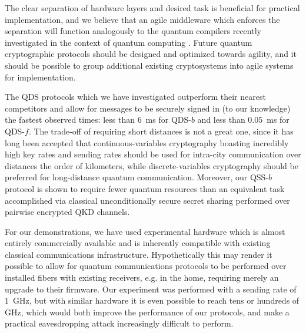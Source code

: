 The clear separation of hardware layers and desired task is beneficial for practical implementation, and we believe that an agile middleware which enforces the separation will function analogously to the quantum compilers recently investigated in the context of quantum computing . Future quantum cryptographic protocols should be designed and optimized towards agility, and it should be possible to group additional existing cryptosystems into agile systems for implementation.

The QDS protocols which we have investigated outperform their nearest competitors and allow for messages to be securely signed in (to our knowledge) the fastest observed times: less than $6$~ms for QDS-$b$ and less than $0.05$~ms for QDS-$f$. The trade-off of requiring short distances is not a great one, since it has long been accepted  that continuous-variables cryptography boasting incredibly high key rates and sending rates should be used for intra-city communication over distances the order of kilometers, while discrete-variables cryptography should be preferred for long-distance quantum communication. Moreover, our QSS-$b$ protocol is shown to require fewer quantum resources than an equivalent task accomplished via classical unconditionally secure secret sharing performed over pairwise encrypted QKD channels.

For our demonstrations, we have used experimental hardware which is almost entirely commercially available and is inherently compatible with existing classical communications infrastructure. Hypothetically this may render it possible to allow for quantum communications protocols to be performed over installed fibers with existing receivers, e.g. in the home, requiring merely an upgrade to their firmware. Our experiment was performed with a sending rate of $1$~GHz, but with similar hardware it is even possible to reach tens or hundreds of GHz, which would both improve the performance of our protocols, and make a practical eavesdropping attack increasingly difficult to perform. 

